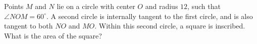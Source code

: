 Points $M$ and $N$ lie on a circle with center $O$ and radius $12$, such that $\angle NOM = 60^\circ$. A second circle is internally tangent to the first circle, and is also tangent to both $NO$ and $MO$. Within this second circle, a square is inscribed. What is the area of the square?
